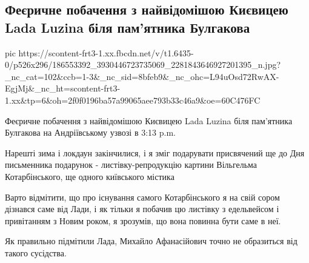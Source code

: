  
 
 
 
 

\subsection{Феєричне побачення з найвідомішою Києвицею Lada Luzina біля пам'ятника Булгакова}
\label{sec:15_05_2021.fb.bilonyk_andrej.2.with_lada_luzina}


\ifcmt
  pic https://scontent-frt3-1.xx.fbcdn.net/v/t1.6435-0/p526x296/186553392_3930446723735069_2281843646927201395_n.jpg?_nc_cat=102&ccb=1-3&_nc_sid=8bfeb9&_nc_ohc=L94uOsd72RwAX-EgjMj&_nc_ht=scontent-frt3-1.xx&tp=6&oh=2f0f0196ba57a99065aee793b33c46a9&oe=60C476FC
\fi

Феєричне побачення з найвідомішою Києвицею Lada Luzina біля пам'ятника
Булгакова на Андріївському узвозі в 3:13 p.m.

Нарешті зима і локдаун закінчилися, і я зміг подарувати присвячений ще до Дня
письменника подарунок - листівку-репродукцію картини Вільгельма Котарбінського,
ще одного київського містика 

Варто  відмітити, що про існування самого Котарбінського я на свій сором
дізнався саме від Лади, і як тільки я побачив цю листівку з едельвейсом і
привітанням з Новим роком, я зрозумів, що вона повинна бути саме в неї.

Як правильно підмітили Лада, Михайло Афанасійович точно не образиться від
такого сусідства.
